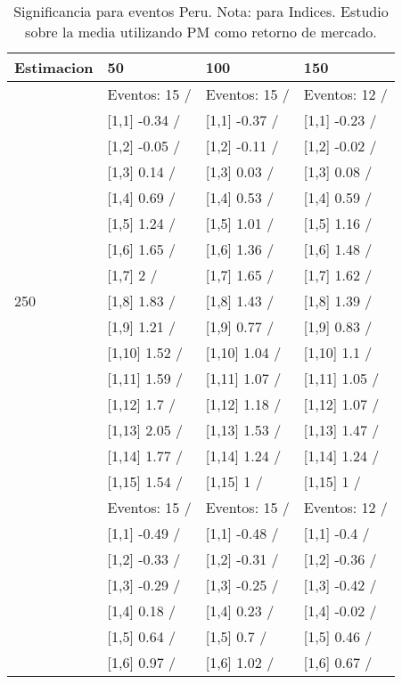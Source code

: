 \begin{table}

\caption{Significancia para eventos Peru. Nota: para Indices. Estudio sobre la media utilizando PM como retorno de mercado.}
\centering
\begin{tabular}[t]{llll}
\toprule
Estimacion & 50 & 100 & 150\\
\midrule
 & Eventos:  15 / & Eventos:  15 / & Eventos:  12 /\\
 & {}[1,1] -0.34  / & {}[1,1] -0.37  / & {}[1,1] -0.23  /\\
 & {}[1,2] -0.05  / & {}[1,2] -0.11  / & {}[1,2] -0.02  /\\
 & {}[1,3] 0.14  / & {}[1,3] 0.03  / & {}[1,3] 0.08  /\\
 & {}[1,4] 0.69  / & {}[1,4] 0.53  / & {}[1,4] 0.59  /\\
\addlinespace
 & {}[1,5] 1.24  / & {}[1,5] 1.01  / & {}[1,5] 1.16  /\\
 & {}[1,6] 1.65  / & {}[1,6] 1.36  / & {}[1,6] 1.48  /\\
 & {}[1,7] 2  / & {}[1,7] 1.65  / & {}[1,7] 1.62  /\\
250 & {}[1,8] 1.83  / & {}[1,8] 1.43  / & {}[1,8] 1.39  /\\
 & {}[1,9] 1.21  / & {}[1,9] 0.77  / & {}[1,9] 0.83  /\\
\addlinespace
 & {}[1,10] 1.52  / & {}[1,10] 1.04  / & {}[1,10] 1.1  /\\
 & {}[1,11] 1.59  / & {}[1,11] 1.07  / & {}[1,11] 1.05  /\\
 & {}[1,12] 1.7  / & {}[1,12] 1.18  / & {}[1,12] 1.07  /\\
 & {}[1,13] 2.05  / & {}[1,13] 1.53  / & {}[1,13] 1.47  /\\
 & {}[1,14] 1.77  / & {}[1,14] 1.24  / & {}[1,14] 1.24  /\\
\addlinespace
 & {}[1,15] 1.54  / & {}[1,15] 1  / & {}[1,15] 1  /\\
 & Eventos:  15 / & Eventos:  15 / & Eventos:  12 /\\
 & {}[1,1] -0.49  / & {}[1,1] -0.48  / & {}[1,1] -0.4  /\\
 & {}[1,2] -0.33  / & {}[1,2] -0.31  / & {}[1,2] -0.36  /\\
 & {}[1,3] -0.29  / & {}[1,3] -0.25  / & {}[1,3] -0.42  /\\
\addlinespace
 & {}[1,4] 0.18  / & {}[1,4] 0.23  / & {}[1,4] -0.02  /\\
 & {}[1,5] 0.64  / & {}[1,5] 0.7  / & {}[1,5] 0.46  /\\
 & {}[1,6] 0.97  / & {}[1,6] 1.02  / & {}[1,6] 0.67  /\\

\end{tabular}
\end{table}

